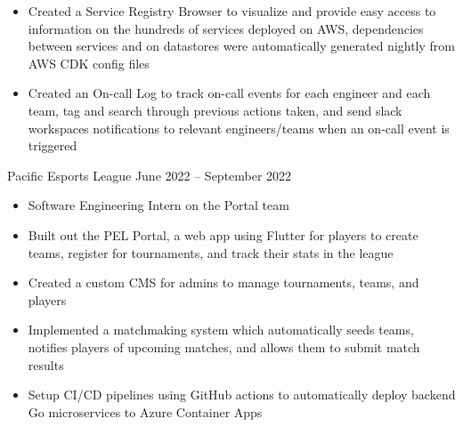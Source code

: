 \documentclass[9pt]{developercv} %
\begin{document}
\begin{entrylist}
{\begin{itemize}[noitemsep,topsep=0pt,parsep=0pt,partopsep=0pt, leftmargin=10pt]
            \item Created a Service Registry Browser to visualize and provide easy access to information on the hundreds of services deployed on AWS, dependencies between services and on datastores were automatically generated nightly from AWS CDK config files
            \item Created an On-call Log to track on-call events for each engineer and each team, tag and search through previous actions taken, and send slack workspaces notifications to relevant engineers/teams when an on-call event is triggered
        \end{itemize}}
	\entry
		{}
		{Pacific Esports League}
		{June 2022 – September 2022}
		{\vspace{-10pt}
        \begin{itemize}[noitemsep,topsep=0pt,parsep=0pt,partopsep=0pt, leftmargin=10pt]
            \item Software Engineering Intern on the Portal team
            \item Built out the PEL Portal, a web app using Flutter for players to create teams, register for tournaments, and track their stats in the league
            \item Created a custom CMS for admins to manage tournaments, teams, and players
            \item Implemented a matchmaking system which automatically seeds teams, notifies players of upcoming matches, and allows them to submit match results
            \item Setup CI/CD pipelines using GitHub actions to automatically deploy backend Go microservices to Azure Container Apps
        \end{itemize}}
\end{entrylist}
\end{document}
